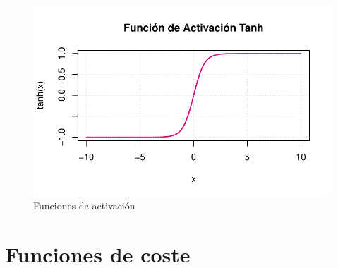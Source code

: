 \documentclass[
  us-letterpaper,
]{scrreprt}
\theoremstyle{plain}
\theoremstyle{definition}
\theoremstyle{plain}
\theoremstyle{definition}
\theoremstyle{remark}
\begin{document}
\begin{figure}
\begin{minipage}{0.33\linewidth}
{\includegraphics{redes_files/figure-pdf/fig-fact-5.pdf}

}


\end{minipage}%
%
\begin{minipage}{0.33\linewidth}



\end{minipage}%

\caption{\label{fig-fact}Funciones de activación}

\end{figure}%

\section{Funciones de coste}\label{funciones-de-coste}
\end{document}
